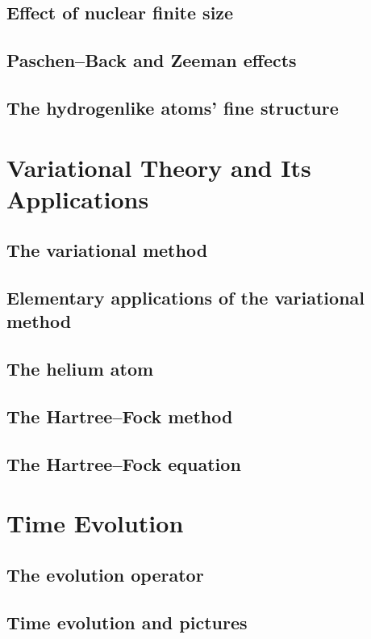 \documentclass{article}
\begin{document}
\subsection{Effect of nuclear finite size}
\subsection{Paschen–Back and Zeeman effects}
\subsection{The hydrogenlike atoms’ fine structure}

\section{Variational Theory and Its Applications}
\subsection{The variational method}
\subsection{Elementary applications of the variational method}
\subsection{The helium atom}
\subsection{The Hartree–Fock method}
\subsection{The Hartree–Fock equation}

\section{Time Evolution}
\subsection{The evolution operator}
\subsection{Time evolution and pictures}
\end{document}
